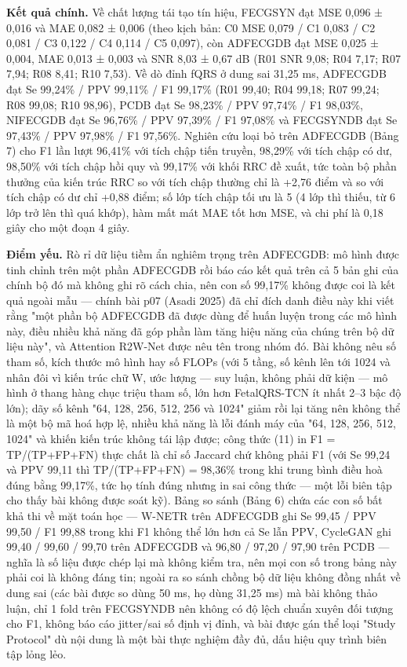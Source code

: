 \documentclass[12pt,a4paper]{article}
\begin{document}
\noindent \textbf{Kết quả chính.} Về chất lượng tái tạo tín hiệu, FECGSYN đạt MSE 0,096 ± 0,016 và MAE 0,082 ± 0,006 (theo kịch bản: C0 MSE 0,079 / C1 0,083 / C2 0,081 / C3 0,122 / C4 0,114 / C5 0,097), còn ADFECGDB đạt MSE 0,025 ± 0,004, MAE 0,013 ± 0,003 và SNR 8,03 ± 0,67 dB (R01 SNR 9,08; R04 7,17; R07 7,94; R08 8,41; R10 7,53). Về dò đỉnh fQRS ở dung sai 31,25 ms, ADFECGDB đạt Se 99,24\% / PPV 99,11\% / F1 99,17\% (R01 99,40; R04 99,18; R07 99,24; R08 99,08; R10 98,96), PCDB đạt Se 98,23\% / PPV 97,74\% / F1 98,03\%, NIFECGDB đạt Se 96,76\% / PPV 97,39\% / F1 97,08\% và FECGSYNDB đạt Se 97,43\% / PPV 97,98\% / F1 97,56\%. Nghiên cứu loại bỏ trên ADFECGDB (Bảng 7) cho F1 lần lượt 96,41\% với tích chập tiến truyền, 98,29\% với tích chập có dư, 98,50\% với tích chập hồi quy và 99,17\% với khối RRC đề xuất, tức toàn bộ phần thưởng của kiến trúc RRC so với tích chập thường chỉ là +2,76 điểm và so với tích chập có dư chỉ +0,88 điểm; số lớp tích chập tối ưu là 5 (4 lớp thì thiếu, từ 6 lớp trở lên thì quá khớp), hàm mất mát MAE tốt hơn MSE, và chi phí là 0,18 giây cho một đoạn 4 giây.\par\vspace{3pt}
\noindent \textbf{Điểm yếu.} Rò rỉ dữ liệu tiềm ẩn nghiêm trọng trên ADFECGDB: mô hình được tinh chỉnh trên một phần ADFECGDB rồi báo cáo kết quả trên cả 5 bản ghi của chính bộ đó mà không ghi rõ cách chia, nên con số 99,17\% không được coi là kết quả ngoài mẫu — chính bài p07 (Asadi 2025) đã chỉ đích danh điều này khi viết rằng "một phần bộ ADFECGDB đã được dùng để huấn luyện trong các mô hình này, điều nhiều khả năng đã góp phần làm tăng hiệu năng của chúng trên bộ dữ liệu này", và Attention R2W-Net được nêu tên trong nhóm đó. Bài không nêu số tham số, kích thước mô hình hay số FLOPs (với 5 tầng, số kênh lên tới 1024 và nhân đôi vì kiến trúc chữ W, ước lượng — suy luận, không phải dữ kiện — mô hình ở thang hàng chục triệu tham số, lớn hơn FetalQRS-TCN ít nhất 2–3 bậc độ lớn); dãy số kênh "64, 128, 256, 512, 256 và 1024" giảm rồi lại tăng nên không thể là một bộ mã hoá hợp lệ, nhiều khả năng là lỗi đánh máy của "64, 128, 256, 512, 1024" và khiến kiến trúc không tái lập được; công thức (11) in F1 = TP/(TP+FP+FN) thực chất là chỉ số Jaccard chứ không phải F1 (với Se 99,24 và PPV 99,11 thì TP/(TP+FP+FN) = 98,36\% trong khi trung bình điều hoà đúng bằng 99,17\%, tức họ tính đúng nhưng in sai công thức — một lỗi biên tập cho thấy bài không được soát kỹ). Bảng so sánh (Bảng 6) chứa các con số bất khả thi về mặt toán học — W-NETR trên ADFECGDB ghi Se 99,45 / PPV 99,50 / F1 99,88 trong khi F1 không thể lớn hơn cả Se lẫn PPV, CycleGAN ghi 99,40 / 99,60 / 99,70 trên ADFECGDB và 96,80 / 97,20 / 97,90 trên PCDB — nghĩa là số liệu được chép lại mà không kiểm tra, nên mọi con số trong bảng này phải coi là không đáng tin; ngoài ra so sánh chồng bộ dữ liệu không đồng nhất về dung sai (các bài được so dùng 50 ms, họ dùng 31,25 ms) mà bài không thảo luận, chỉ 1 fold trên FECGSYNDB nên không có độ lệch chuẩn xuyên đối tượng cho F1, không báo cáo jitter/sai số định vị đỉnh, và bài được gán thể loại "Study Protocol" dù nội dung là một bài thực nghiệm đầy đủ, dấu hiệu quy trình biên tập lỏng lẻo.\par\vspace{3pt}
\end{document}
